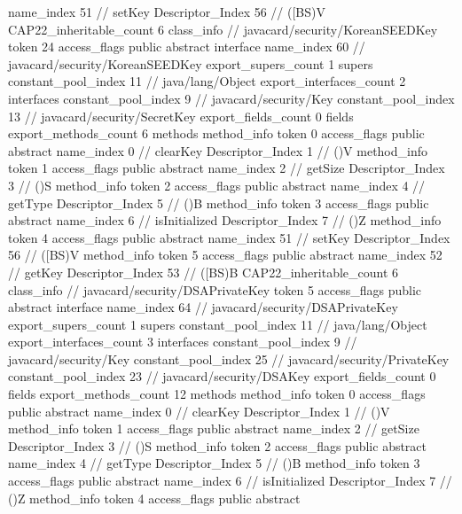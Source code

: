 {{{{{					name_index	51		// setKey
					Descriptor_Index	56		// ([BS)V
				}
			}
			CAP22_inheritable_count	6
		}
		class_info {		// javacard/security/KoreanSEEDKey
			token	24
			access_flags	public abstract interface
			name_index	60		// javacard/security/KoreanSEEDKey
			export_supers_count	1
			supers {
				constant_pool_index	11		// java/lang/Object
			}
			export_interfaces_count	2
			interfaces {
				constant_pool_index	9		// javacard/security/Key
				constant_pool_index	13		// javacard/security/SecretKey
			}
			export_fields_count	0
			fields {
			}
			export_methods_count	6
			methods {
				method_info {
					token	0
					access_flags	public abstract
					name_index	0		// clearKey
					Descriptor_Index	1		// ()V
				}
				method_info {
					token	1
					access_flags	public abstract
					name_index	2		// getSize
					Descriptor_Index	3		// ()S
				}
				method_info {
					token	2
					access_flags	public abstract
					name_index	4		// getType
					Descriptor_Index	5		// ()B
				}
				method_info {
					token	3
					access_flags	public abstract
					name_index	6		// isInitialized
					Descriptor_Index	7		// ()Z
				}
				method_info {
					token	4
					access_flags	public abstract
					name_index	51		// setKey
					Descriptor_Index	56		// ([BS)V
				}
				method_info {
					token	5
					access_flags	public abstract
					name_index	52		// getKey
					Descriptor_Index	53		// ([BS)B
				}
			}
			CAP22_inheritable_count	6
		}
		class_info {		// javacard/security/DSAPrivateKey
			token	5
			access_flags	public abstract interface
			name_index	64		// javacard/security/DSAPrivateKey
			export_supers_count	1
			supers {
				constant_pool_index	11		// java/lang/Object
			}
			export_interfaces_count	3
			interfaces {
				constant_pool_index	9		// javacard/security/Key
				constant_pool_index	25		// javacard/security/PrivateKey
				constant_pool_index	23		// javacard/security/DSAKey
			}
			export_fields_count	0
			fields {
			}
			export_methods_count	12
			methods {
				method_info {
					token	0
					access_flags	public abstract
					name_index	0		// clearKey
					Descriptor_Index	1		// ()V
				}
				method_info {
					token	1
					access_flags	public abstract
					name_index	2		// getSize
					Descriptor_Index	3		// ()S
				}
				method_info {
					token	2
					access_flags	public abstract
					name_index	4		// getType
					Descriptor_Index	5		// ()B
				}
				method_info {
					token	3
					access_flags	public abstract
					name_index	6		// isInitialized
					Descriptor_Index	7		// ()Z
				}
				method_info {
					token	4
					access_flags	public abstract
}}}}}
